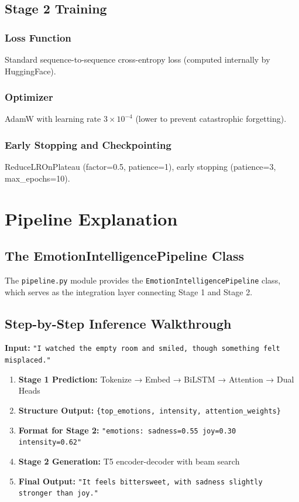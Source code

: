 \documentclass[12pt, a4paper]{report}
\begin{document}
\section{Stage 2 Training}

\subsection{Loss Function}

Standard sequence-to-sequence cross-entropy loss (computed internally by HuggingFace).

\subsection{Optimizer}

AdamW with learning rate $3 \times 10^{-4}$ (lower to prevent catastrophic forgetting).

\subsection{Early Stopping and Checkpointing}

ReduceLROnPlateau (factor=0.5, patience=1), early stopping (patience=3, max\_epochs=10).

\chapter{Pipeline Explanation}

\section{The EmotionIntelligencePipeline Class}

The \texttt{pipeline.py} module provides the \texttt{EmotionIntelligencePipeline} class, which serves as the integration layer connecting Stage 1 and Stage 2.

\section{Step-by-Step Inference Walkthrough}

\textbf{Input:} \texttt{"I watched the empty room and smiled, though something felt misplaced."}

\begin{enumerate}
    \item \textbf{Stage 1 Prediction:} Tokenize → Embed → BiLSTM → Attention → Dual Heads
    \item \textbf{Structure Output:} \texttt{\{top\_emotions, intensity, attention\_weights\}}
    \item \textbf{Format for Stage 2:} \texttt{"emotions: sadness=0.55 joy=0.30 intensity=0.62"}
    \item \textbf{Stage 2 Generation:} T5 encoder-decoder with beam search
    \item \textbf{Final Output:} \texttt{"It feels bittersweet, with sadness slightly stronger than joy."}
\end{enumerate}
\end{document}
